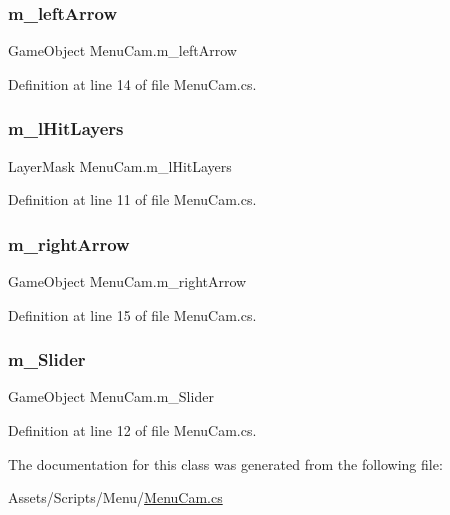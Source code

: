 \mbox{\label{class_menu_cam_a427bf2012fef3d7a249b65be3bbcb646}} 
\subsubsection{\texorpdfstring{m\+\_\+left\+Arrow}{m\_leftArrow}}
{\footnotesize\ttfamily Game\+Object Menu\+Cam.\+m\+\_\+left\+Arrow}



Definition at line 14 of file Menu\+Cam.\+cs.

\mbox{\label{class_menu_cam_a66c081dba7c09e19c622518c5d249ae9}} 
\subsubsection{\texorpdfstring{m\+\_\+l\+Hit\+Layers}{m\_lHitLayers}}
{\footnotesize\ttfamily Layer\+Mask Menu\+Cam.\+m\+\_\+l\+Hit\+Layers}



Definition at line 11 of file Menu\+Cam.\+cs.

\mbox{\label{class_menu_cam_afa17cc96b5e31556c7de5eb9fff6aa81}} 
\subsubsection{\texorpdfstring{m\+\_\+right\+Arrow}{m\_rightArrow}}
{\footnotesize\ttfamily Game\+Object Menu\+Cam.\+m\+\_\+right\+Arrow}



Definition at line 15 of file Menu\+Cam.\+cs.

\mbox{\label{class_menu_cam_a0128de9f975a3f41b97bf54551dc9c3d}} 
\subsubsection{\texorpdfstring{m\+\_\+\+Slider}{m\_Slider}}
{\footnotesize\ttfamily Game\+Object Menu\+Cam.\+m\+\_\+\+Slider}



Definition at line 12 of file Menu\+Cam.\+cs.



The documentation for this class was generated from the following file\+:\begin{DoxyCompactItemize}
\item 
Assets/\+Scripts/\+Menu/\mbox{\hyperlink{_menu_cam_8cs}{Menu\+Cam.\+cs}}\end{DoxyCompactItemize}
